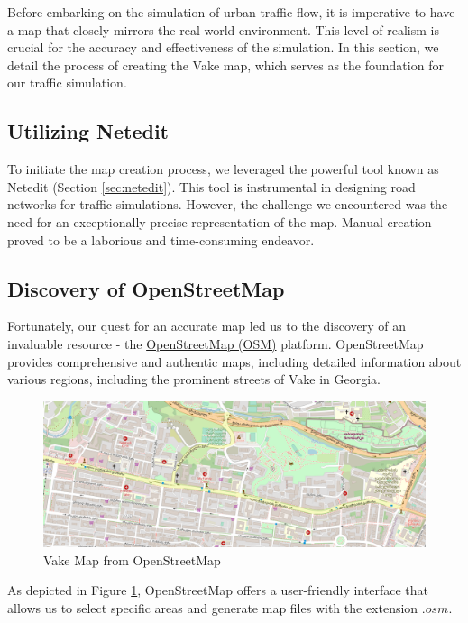 Before embarking on the simulation of urban traffic flow, it is imperative to have a map that closely mirrors the real-world environment. This level of realism is crucial for the accuracy and effectiveness of the simulation. In this section, we detail the process of creating the Vake map, which serves as the foundation for our traffic simulation.

\subsection{Utilizing Netedit}
To initiate the map creation process, we leveraged the powerful tool known as Netedit (Section \ref{sec:netedit}). This tool is instrumental in designing road networks for traffic simulations. However, the challenge we encountered was the need for an exceptionally precise representation of the map. Manual creation proved to be a laborious and time-consuming endeavor.

\subsection{Discovery of OpenStreetMap}
Fortunately, our quest for an accurate map led us to the discovery of an invaluable resource - the \href{http://openstreetmap.org}{OpenStreetMap (OSM)} platform. OpenStreetMap provides comprehensive and authentic maps, including detailed information about various regions, including the prominent streets of Vake in Georgia.

\begin{figure}[h]
    \centering
    \includegraphics[width=1\linewidth]{images/methodology/vake-openstreetmap.png}
    \caption{Vake Map from OpenStreetMap}
    \label{fig:vake-openstreetmap}
\end{figure}

As depicted in Figure \ref{fig:vake-openstreetmap}, OpenStreetMap offers a user-friendly interface that allows us to select specific areas and generate map files with the extension \textbf{$.osm$}.

